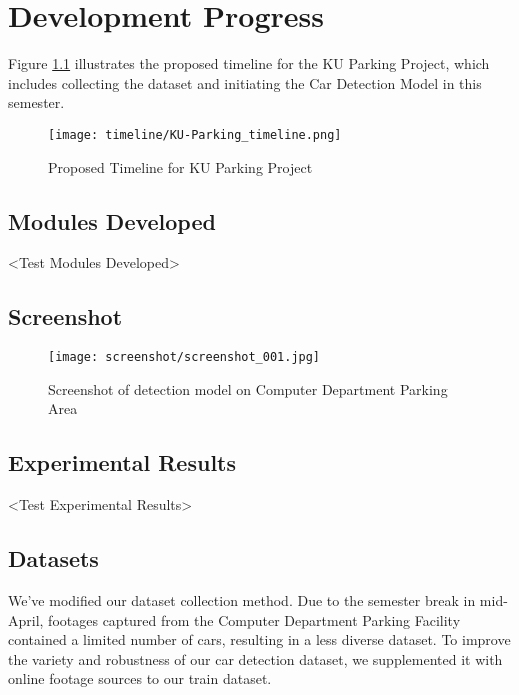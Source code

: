 \chapter{Development Progress}
\label{chap:developmentprogress}
Figure \ref{fig:timeline-dev-progress} illustrates the proposed timeline for the KU Parking Project, which includes collecting the dataset and initiating the Car Detection Model in this semester.

\begin{figure}[H]
    \centering
    \texttt{[image: timeline/KU-Parking\_timeline.png]}
    \caption{Proposed Timeline for KU Parking Project}
    \label{fig:timeline-dev-progress}
\end{figure}

\section{Modules Developed}
\label{section:module-developed}
<Test Modules Developed>

\section{Screenshot}
\label{section:screenshot}
\begin{figure}[H]
    \centering
    \texttt{[image: screenshot/screenshot\_001.jpg]}
    \caption{Screenshot of detection model on Computer Department Parking Area}
    \label{fig:screenshot001}
\end{figure}


\section{Experimental Results}
\label{section:experimental-results}
<Test Experimental Results>

\section{Datasets}
\label{section:datasets}
We've modified our dataset collection method. Due to the semester break in mid-April, footages captured from the Computer Department Parking Facility contained a limited number of cars, resulting in a less diverse dataset. To improve the variety and robustness of our car detection dataset, we supplemented it with online footage sources to our train dataset.

